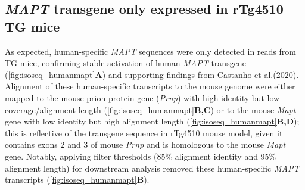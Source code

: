 \begin{figure}[p]
	\captionsetup{width=0.95\textwidth}
\end{figure}


\subsection{\textit{MAPT} transgene only expressed in rTg4510 TG mice}
\label{mapt_transgene_whole}
As expected, human-specific \textit{MAPT} sequences were only detected in reads from TG mice, confirming stable activation of human \textit{MAPT} transgene (\cref{fig:isoseq_humanmapt}\textbf{A}) and supporting findings from Castanho et al.(2020)\cite{Castanho2020}. Alignment of these human-specific transcripts to the mouse genome were either mapped to the mouse prion protein gene (\textit{Prnp}) with high identity but low coverage/alignment length (\cref{fig:isoseq_humanmapt}\textbf{B,C}) or to the mouse \textit{Mapt} gene with low identity but high alignment length (\cref{fig:isoseq_humanmapt}\textbf{B,D}); this is reflective of the transgene sequence in rTg4510 mouse model, given it contains exons 2 and 3 of mouse \textit{Prnp}\cite{Ramsden2005} and is homologous to the mouse \textit{Mapt} gene. Notably, applying filter thresholds (85\% alignment identity and 95\% alignment length) for downstream analysis removed these human-specific \textit{MAPT} transcripts (\cref{fig:isoseq_humanmapt}\textbf{B}). 

